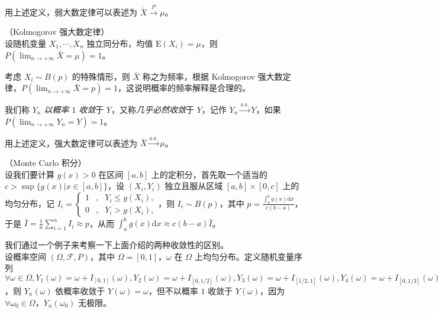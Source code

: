 \documentclass[../main.tex]{subfiles}
\begin{document}
用上述定义，弱大数定律可以表述为 $\bar X\overset{P}{\rightarrow}\mu$。

\begin{theorem}\label{thm:5.2.2}
    （Kolmogorov 强大数定律）\\
    设随机变量 $X_1,\cdots,X_n$ 独立同分布，均值 $\mathrm E(X_i)=\mu$，则 $P(\lim_{n\rightarrow+\infty}\bar X=\mu)=1$。
\end{theorem}

考虑 $X_i\sim B(p)$ 的特殊情形，则 $\bar X$ 称之为频率，根据 Kolmogorov 强大数定律，$P(\lim_{n\rightarrow+\infty}\bar X=p)=1$，这说明概率的频率解释是合理的。

\begin{definition}\label{def:5.2.2}
    我们称 $Y_n$ \emph{以概率 $1$ 收敛}于 $Y$，又称\emph{几乎必然收敛}于 $Y$，记作 $Y_n\overset{\mathrm{a.s.}}{\rightarrow}Y$，如果 $P(\lim_{n\rightarrow+\infty}Y_n=Y)=1$。
\end{definition}

用上述定义，强大数定律可以表述为 $\bar X\overset{\mathrm{a.s.}}{\rightarrow}\mu$。

\begin{example}
    （Monte Carlo 积分）\\
    设我们要计算 $g(x)>0$ 在区间 $[a,b]$ 上的定积分，首先取一个适当的 $c>\sup\{g(x)|x\in[a,b]\}$，设 $(X_i,Y_i)$ 独立且服从区域 $[a,b]\times[0,c]$ 上的均匀分布，记 $I_i=\left\{
        \begin{aligned}
            1 & , & Y_i\leq g(X_i), \\
            0 & , & Y_i>g(X_i),
        \end{aligned}
        \right.$，则 $I_i\sim B(p)$，其中 $p=\frac{\int_a^b g(x)\mathrm{d}x}{c(b-a)}$，于是 $\bar I=\frac1n\sum_{i=1}^nI_i\approx p$，从而 $\int_a^b g(x)\mathrm{d}x\approx c(b-a)\bar I$。
\end{example}

\begin{example}
    我们通过一个例子来考察一下上面介绍的两种收敛性的区别。\\
    设概率空间 $(\Omega,\mathcal F,P)$，其中 $\Omega=[0,1]$，$\omega$ 在 $\Omega$ 上均匀分布。定义随机变量序列 $\forall\omega\in\Omega,Y_1(\omega)=\omega+I_{[0,1]}(\omega),Y_2(\omega)=\omega+I_{[0,1/2]}(\omega),Y_3(\omega)=\omega+I_{[1/2,1]}(\omega),Y_4(\omega)=\omega+I_{[0,1/3]}(\omega),Y_5(\omega)=\omega+I_{[1/3,2/3]}(\omega),Y_6(\omega)=\omega+I_{[2/3,1]}(\omega),\cdots$，则 $Y_n(\omega)$ 依概率收敛于 $Y(\omega)=\omega$，但不以概率 $1$ 收敛于 $Y(\omega)$，因为 $\forall \omega_0\in\Omega$，$Y_n(\omega_0)$ 无极限。
\end{example}
\end{document}
